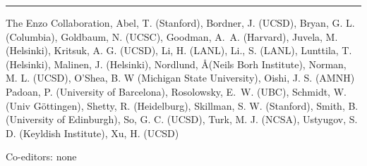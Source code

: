 
\rule[3pt]{402pt}{.1mm}

\noindent The Enzo Collaboration,  Abel, T. (Stanford),   Bordner, J.
(UCSD),   Bryan, G. L. (Columbia), 
Goldbaum, N. (UCSC),   Goodman, A.~A.
(Harvard),    Juvela, M. (Helsinki),     Kritsuk, A. G. (UCSD),   Li, H. (LANL),
   Li., S. (LANL), Lunttila, T. (Helsinki),
Malinen, J. (Helsinki), Nordlund, \AA (Neils Borh
Institute),   Norman, M. L. (UCSD),    O'Shea, B. W (Michigan State University),
Oishi, J. S. (AMNH)   Padoan, P. (University of Barcelona),   
Rosolowsky, E.~W. (UBC),   Schmidt, W. (Univ
G\"ottingen),   Shetty, R. (Heidelburg), 
Skillman,
S. W. (Stanford),    Smith, B. (University of Edinburgh),
So, G. C. (UCSD),   
   Turk, M. J. (NCSA), Ustyugov, S. D. (Keyldish Institute),
Xu, H. (UCSD)

\noindent Co-editors: none


